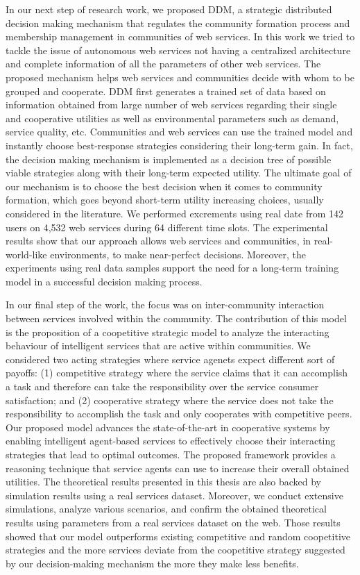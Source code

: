 In our next step of research work, we proposed DDM, a strategic distributed decision making mechanism that regulates the community formation process and membership management in communities of web services. In this work we tried to tackle the issue of autonomous web services not having a centralized architecture and complete information of all the parameters of other web services. The proposed mechanism helps web services and communities decide with whom to be grouped and cooperate. DDM first generates a trained set of data based on information obtained from large number of web services regarding their single and cooperative utilities as well as environmental parameters such as demand, service quality, etc. Communities and web services can use the trained model and instantly choose best-response strategies considering their long-term gain. In fact, the decision making mechanism is implemented as a decision tree of possible viable strategies along with their long-term expected utility. The ultimate goal of our mechanism is to choose the best decision when it comes to community formation, which goes beyond short-term utility increasing choices, usually considered in the literature. We performed excrements using real date from 142 users on 4,532 web services during 64 different time slots. The experimental results show that our approach allows web services and communities, in real-world-like environments, to make near-perfect decisions. Moreover, the experiments using real data samples support the need for a long-term training model in a successful decision making process.

In our final step of the work, the focus was on inter-community interaction between services involved within the community. The contribution of this model is the proposition of a coopetitive strategic model to analyze the interacting behaviour of intelligent services that are active within communities. We considered two acting strategies where service agenets expect different sort of payoffs: (1) competitive strategy where the service claims that it can accomplish a task and therefore can take the responsibility over the service consumer satisfaction; and (2) cooperative strategy where the service does not take the responsibility to accomplish the task and only cooperates with competitive peers. Our proposed model advances the state-of-the-art in cooperative systems by enabling intelligent agent-based services to effectively choose their interacting strategies that lead to optimal outcomes. The proposed framework provides a reasoning technique that service agents can use to increase their overall obtained utilities. The theoretical results presented in this thesis are also backed by simulation results using a real services dataset. Moreover, we conduct extensive simulations, analyze various scenarios, and confirm the obtained theoretical results using parameters from a real services dataset on the web. Those results showed that our model outperforms existing competitive and random coopetitive strategies and the more
services deviate from the coopetitive strategy suggested by our decision-making mechanism the more they make less benefits.


